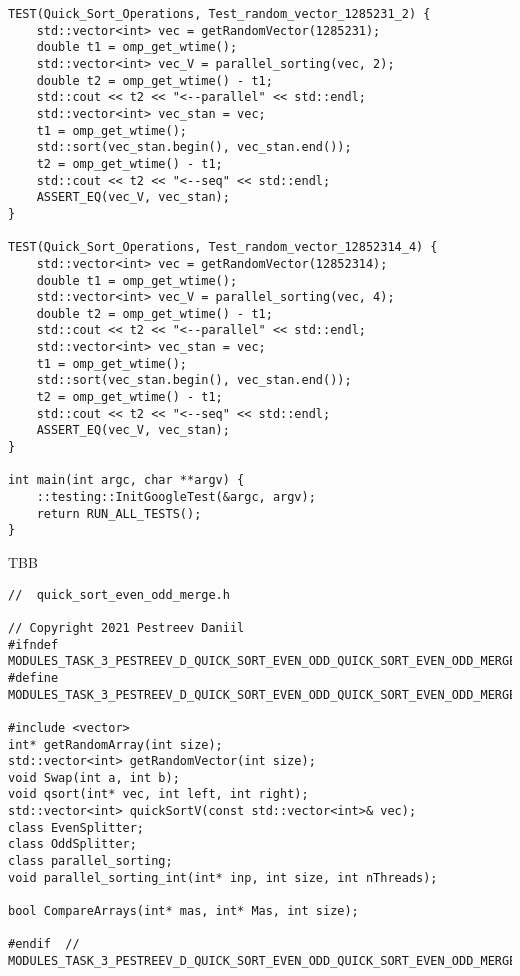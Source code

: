 \documentclass{report}
\begin{document}
\begin{lstlisting}
TEST(Quick_Sort_Operations, Test_random_vector_1285231_2) {
    std::vector<int> vec = getRandomVector(1285231);
    double t1 = omp_get_wtime();
    std::vector<int> vec_V = parallel_sorting(vec, 2);
    double t2 = omp_get_wtime() - t1;
    std::cout << t2 << "<--parallel" << std::endl;
    std::vector<int> vec_stan = vec;
    t1 = omp_get_wtime();
    std::sort(vec_stan.begin(), vec_stan.end());
    t2 = omp_get_wtime() - t1;
    std::cout << t2 << "<--seq" << std::endl;
    ASSERT_EQ(vec_V, vec_stan);
}

TEST(Quick_Sort_Operations, Test_random_vector_12852314_4) {
    std::vector<int> vec = getRandomVector(12852314);
    double t1 = omp_get_wtime();
    std::vector<int> vec_V = parallel_sorting(vec, 4);
    double t2 = omp_get_wtime() - t1;
    std::cout << t2 << "<--parallel" << std::endl;
    std::vector<int> vec_stan = vec;
    t1 = omp_get_wtime();
    std::sort(vec_stan.begin(), vec_stan.end());
    t2 = omp_get_wtime() - t1;
    std::cout << t2 << "<--seq" << std::endl;
    ASSERT_EQ(vec_V, vec_stan);
}

int main(int argc, char **argv) {
    ::testing::InitGoogleTest(&argc, argv);
    return RUN_ALL_TESTS();
}

\end{lstlisting}

\par TBB

\begin{lstlisting}
//  quick_sort_even_odd_merge.h

// Copyright 2021 Pestreev Daniil
#ifndef MODULES_TASK_3_PESTREEV_D_QUICK_SORT_EVEN_ODD_QUICK_SORT_EVEN_ODD_MERGE_H_
#define MODULES_TASK_3_PESTREEV_D_QUICK_SORT_EVEN_ODD_QUICK_SORT_EVEN_ODD_MERGE_H_

#include <vector>
int* getRandomArray(int size);
std::vector<int> getRandomVector(int size);
void Swap(int a, int b);
void qsort(int* vec, int left, int right);
std::vector<int> quickSortV(const std::vector<int>& vec);
class EvenSplitter;
class OddSplitter;
class parallel_sorting;
void parallel_sorting_int(int* inp, int size, int nThreads);

bool CompareArrays(int* mas, int* Mas, int size);

#endif  // MODULES_TASK_3_PESTREEV_D_QUICK_SORT_EVEN_ODD_QUICK_SORT_EVEN_ODD_MERGE_H_

\end{lstlisting}
\end{document}
